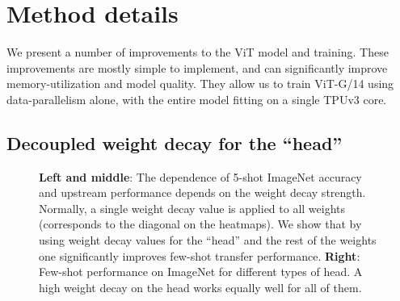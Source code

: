\section{Method details}\label{sec:setup}

We present a number of improvements to the ViT model and training.
These improvements are mostly simple to implement, and can significantly improve memory-utilization and model quality.
They allow us to train ViT-G/14 using data-parallelism alone, with the entire model fitting on a single TPUv3 core.

\subsection{Decoupled weight decay for the ``head''}

\begin{figure}%
    \centering
    \hspace*{.1in}
    \caption{\textbf{Left and middle}: The dependence of 5-shot ImageNet accuracy and upstream performance depends on the weight decay strength. Normally, a single weight decay value is applied to all weights (corresponds to the diagonal on the heatmaps). We show that by using weight decay values for the ``head'' and the rest of the weights one significantly improves few-shot transfer performance.
    \textbf{Right}: Few-shot performance on ImageNet for different types of head.  A high weight decay on the head works equally well for all of them.}%
    \vspace{-1em}
    \label{fig:wd}%
\end{figure}

